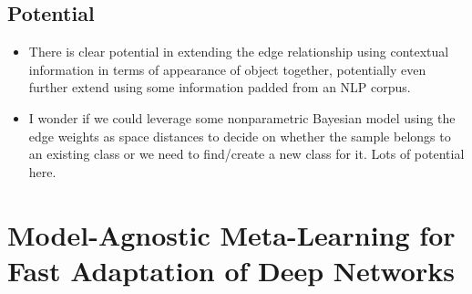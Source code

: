 \documentclass{article}
\begin{document}
\subsection{Potential}
\begin{itemize}
    \item There is clear potential in extending the edge relationship using contextual information in terms of appearance of object together, potentially even further extend using some information padded from an NLP corpus.
    \item I wonder if we could leverage some nonparametric Bayesian model using the edge weights as space distances to decide on whether the sample belongs to an existing class or we need to find/create a new class for it. Lots of potential here.
\end{itemize}

\section{Model-Agnostic Meta-Learning for Fast Adaptation of Deep Networks \cite{DBLP:journals/corr/FinnAL17}}
\end{document}
